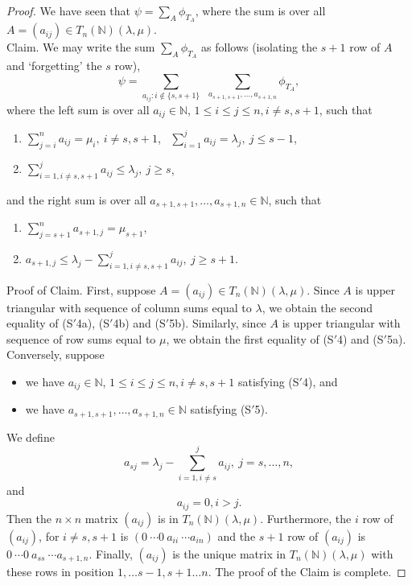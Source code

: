 \documentclass[ALCO,Unicode]{cedram}
\newcommand{\la}{\lambda}
\numberwithin{equation}{section}
\begin{document}
\begin{proof}
 We have seen that $\psi = \sum_{A}\phi_{T_A}$, where the sum is over all $A=(a_{ij}) \in T_{n}(\mathbb{N})(\la, \mu)$. \\
 Claim. We may write the sum $\sum_{A}\phi_{T_A}$ as follows (isolating the $s+1$ row of $A$ and `forgetting' the $s$ row), \[\psi = \sum_{a_{ij}: i \notin \{s, s+1\}} \  \   \sum_{a_{s+1,s+1},\dots,a_{s+1,n}}\phi_{T_A},\] where the left sum is over all  $a_{ij} \in \mathbb{N}$, $1 \le i \le j \le n, i\neq s,s+1$, such that
\begin{enumerate}
	\item[(S$'$4a)] $\sum_{j=i}^{n} a_{ij}=\mu_i, \  i \neq s,s+1$, \  $\sum_{i=1}^{j} a_{ij}=\lambda_j, \  j \le s-1$,
	\item[(S$'$4b)] $ \sum_{i=1, i \neq s,s+1}^{j}a_{ij} \le \lambda_j, \  j \ge s$,
\end{enumerate}	
and the right sum is over all  $a_{s+1,s+1},\dots,a_{s+1,n} \in \mathbb{N}$, such that
\begin{enumerate}
	\item[(S$'$5a)] $\sum_{j=s+1}^{n} a_{s+1,j}=\mu_{s+1}$,
	\item[(S$'$5b)] $ a_{s+1,j} \le \lambda _j - \sum_{i=1, i \neq s,s+1}^{j}a_{ij}, \  j \ge s+1$.
\end{enumerate}	
Proof of Claim. First, suppose $A=(a_{ij}) \in T_{n}(\mathbb{N})(\la, \mu)$. Since $A$ is upper triangular with sequence of column sums equal to $\lambda$, we obtain the second equality of (S$'$4a), (S$'$4b) and (S$'$5b). Similarly, since  $A$ is upper triangular with sequence of row sums equal to $\mu$, we obtain the first equality of (S$'$4) and (S$'$5a). Conversely, suppose \begin{itemize} \item we have $a_{ij} \in \mathbb{N}$, $1 \le i \le j \le n, i\neq s,s+1$ satisfying (S$'$4), and \item we have $a_{s+1,s+1},\dots,a_{s+1,n} \in \mathbb{N}$ satisfying  (S$'$5).\end{itemize} We define  \begin{equation}\label{ss}a_{sj}=\lambda_j- \sum_{i=1, i \neq s}^{j}a_{ij}, \  j=s,\dots,n, \end{equation} and \[a_{ij}=0, i>j.\]Then the $n \times n$ matrix $(a_{ij})$ is in $T_n(\mathbb{N})(\lambda, \mu)$. Furthermore, the $i$ row of $(a_{ij})$, for $i \neq s,s+1$ is $(0 \  \cdots 0 \   a_{ii}\  \cdots a_{in})$ and the $s+1$ row of $(a_{ij})$ is $0 \  \cdots 0 \  a_{ss} \  \cdots a_{s+1,n}.$ Finally, $(a_{ij})$ is the unique matrix in $T_n(\mathbb{N})(\lambda, \mu)$ with these rows in position $1, \dots s-1, s+1 \dots n$. The proof of the Claim  is complete.


\end{proof}
\end{document}

